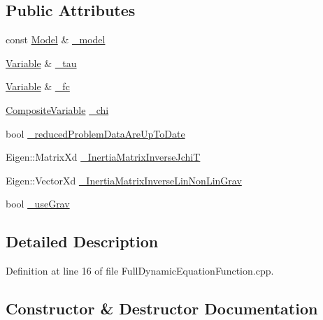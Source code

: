 \subsection*{Public Attributes}
\begin{DoxyCompactItemize}
\item 
const \hyperlink{classocra_1_1Model}{Model} \& \hyperlink{structFullDynamicEquationFunction_1_1Pimpl_a180b0f0401cc9ff23b24d974823215d9}{\+\_\+model}
\item 
\hyperlink{classocra_1_1Variable}{Variable} \& \hyperlink{structFullDynamicEquationFunction_1_1Pimpl_a952d62f65cebf67e50d0d6a091f937c4}{\+\_\+tau}
\item 
\hyperlink{classocra_1_1Variable}{Variable} \& \hyperlink{structFullDynamicEquationFunction_1_1Pimpl_ab19caa3b14b35bba6a5dc5ea490cb7b4}{\+\_\+fc}
\item 
\hyperlink{classocra_1_1CompositeVariable}{Composite\+Variable} \hyperlink{structFullDynamicEquationFunction_1_1Pimpl_a795bb07591fdf52c4b60cccfb6b3e811}{\+\_\+chi}
\item 
bool \hyperlink{structFullDynamicEquationFunction_1_1Pimpl_a2712281ce355bde0730d888d8e92b2f8}{\+\_\+reduced\+Problem\+Data\+Are\+Up\+To\+Date}
\item 
Eigen\+::\+Matrix\+Xd \hyperlink{structFullDynamicEquationFunction_1_1Pimpl_a66a532ac843e6bb0255918262e48a947}{\+\_\+\+Inertia\+Matrix\+Inverse\+JchiT}
\item 
Eigen\+::\+Vector\+Xd \hyperlink{structFullDynamicEquationFunction_1_1Pimpl_a5b5154c8b3e5725507192b9055e2b298}{\+\_\+\+Inertia\+Matrix\+Inverse\+Lin\+Non\+Lin\+Grav}
\item 
bool \hyperlink{structFullDynamicEquationFunction_1_1Pimpl_a7a8eb59e31eca20e45bd63f2975ff27b}{\+\_\+use\+Grav}
\end{DoxyCompactItemize}


\subsection{Detailed Description}


Definition at line 16 of file Full\+Dynamic\+Equation\+Function.\+cpp.



\subsection{Constructor \& Destructor Documentation}
\hypertarget{structFullDynamicEquationFunction_1_1Pimpl_acc3b35606d52aa163f27d80f49cb3aaf}{}\label{structFullDynamicEquationFunction_1_1Pimpl_acc3b35606d52aa163f27d80f49cb3aaf} 
